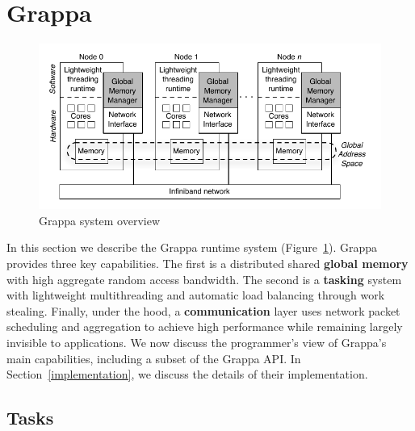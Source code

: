 \section{Grappa} \label{sec:grappa}

\begin{figure}[t]
\begin{center}
  \includegraphics[width=0.95\columnwidth]{figs/system-overview}
\begin{minipage}{0.95\columnwidth}
  \caption{\label{fig:grappa} Grappa system overview}
\end{minipage}
\vspace{-3ex}
\end{center}
\end{figure}

In this section we describe the Grappa runtime system
(Figure~\ref{fig:grappa}). 
Grappa provides three key capabilities. The first is a distributed
shared \textbf{global memory} with high aggregate random access
bandwidth. The second is a \textbf{tasking} system with lightweight
multithreading and automatic load balancing through work
stealing. Finally, under the hood, a \textbf{communication} layer uses
network packet scheduling and aggregation to achieve high performance
while remaining largely invisible to applications. We now discuss the programmer's view of
Grappa's main capabilities, including a subset of the Grappa API. In
Section~\ref{implementation}, we discuss the details of their
implementation.


\subsection{Tasks}



